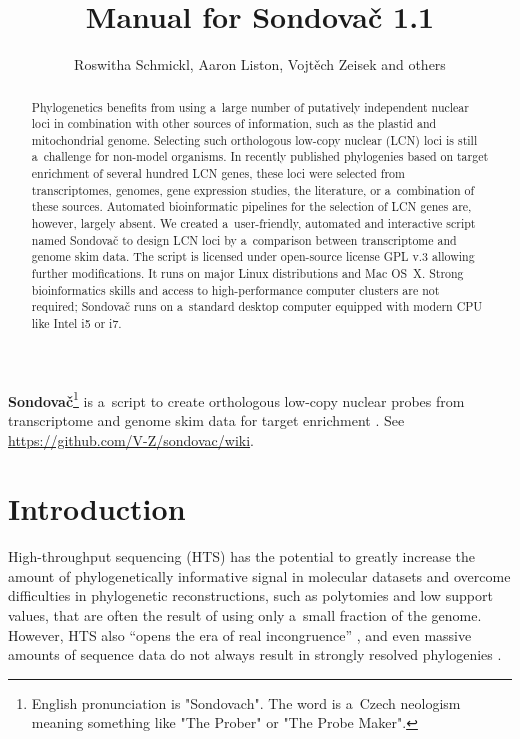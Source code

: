 \documentclass[a4paper, 11pt, twoside]{article}
\title{Manual for Sondovač 1.1}
\author{Roswitha Schmickl, Aaron Liston, Vojtěch Zeisek and others}
\begin{document}
\maketitle
\textbf{Sondovač}\footnote{English pronunciation is "Sondovach". The word is a~Czech neologism meaning something like "The Prober" or "The Probe Maker".} is a~script to create orthologous low-copy nuclear probes from transcriptome and genome skim data for target enrichment \citep{Schmickl2016}. See \url{https://github.com/V-Z/sondovac/wiki}.

\begin{abstract}
Phylogenetics benefits from using a~large number of putatively independent nuclear loci in combination with other sources of information, such as the plastid and mitochondrial genome. Selecting such orthologous low-copy nuclear (LCN) loci is still a~challenge for non-model organisms. In recently published phylogenies based on target enrichment of several hundred LCN genes, these loci were selected from transcriptomes, genomes, gene expression studies, the literature, or a~combination of these sources. Automated bioinformatic pipelines for the selection of LCN genes are, however, largely absent. We created a~user-friendly, automated and interactive script named Sondovač to design LCN loci by a~comparison between transcriptome and genome skim data. The script is licensed under open-source license GPL v.3 allowing further modifications. It runs on major Linux distributions and Mac OS~X. Strong bioinformatics skills and access to high-performance computer clusters are not required; Sondovač runs on a~standard desktop computer equipped with modern CPU like Intel i5 or i7.
\end{abstract}

\tableofcontents
\listoffigures
\listoftables
\vskip 1cm



\section{Introduction}

High-throughput sequencing (HTS) has the potential to greatly increase the amount of phylogenetically informative signal in molecular datasets \citep{Parks2009, Parks2012} and overcome difficulties in phylogenetic reconstructions, such as polytomies and low support values, that are often the result of using only a~small fraction of the genome. However, HTS also “opens the era of real incongruence” \citep{Jeffroy2006}, and even massive amounts of sequence data do not always result in strongly resolved phylogenies \citep{Pyron2015}.
\end{document}

